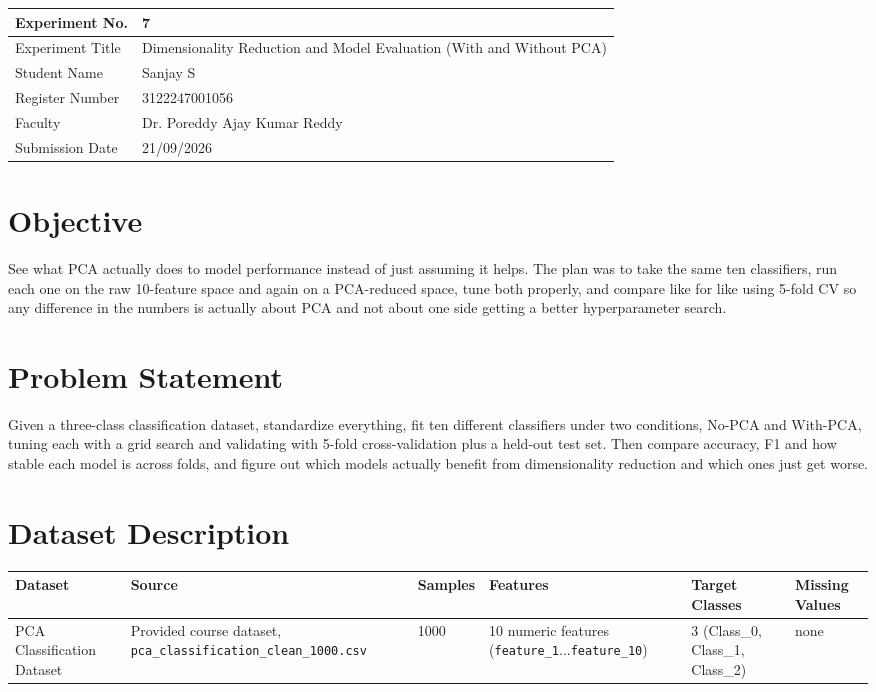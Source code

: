 \documentclass[12pt,a4paper]{article}
\begin{document}
\begin{tabular}{|p{4cm}|p{11cm}|}
\hline
Experiment No. & 7 \\ \hline
Experiment Title & Dimensionality Reduction and Model Evaluation (With and Without PCA)\footnotemark \\ \hline
Student Name & Sanjay S \\ \hline
Register Number & 3122247001056 \\ \hline
Faculty & Dr. Poreddy Ajay Kumar Reddy \\ \hline
Submission Date & 21/09/2026 \\ \hline
\end{tabular}

\section{Objective}
See what PCA actually does to model performance instead of just assuming it helps. The plan was to
take the same ten classifiers, run each one on the raw 10-feature space and again on a PCA-reduced
space, tune both properly, and compare like for like using 5-fold CV so any difference in the numbers
is actually about PCA and not about one side getting a better hyperparameter search.

\section{Problem Statement}
Given a three-class classification dataset, standardize everything, fit ten different classifiers
under two conditions, No-PCA and With-PCA, tuning each with a grid search and validating with 5-fold
cross-validation plus a held-out test set. Then compare accuracy, F1 and how stable each model is
across folds, and figure out which models actually benefit from dimensionality reduction and which
ones just get worse.

\section{Dataset Description}
\begin{longtable}{|p{3cm}|p{3.6cm}|p{1.6cm}|p{1.8cm}|p{2cm}|p{2.5cm}|}
\hline
\textbf{Dataset} & \textbf{Source} & \textbf{Samples} & \textbf{Features} & \textbf{Target Classes} & \textbf{Missing Values} \\ \hline
PCA Classification Dataset & Provided course dataset, \texttt{pca\_classification\_clean\_1000.csv} & 1000 & 10 numeric features (\texttt{feature\_1}...\texttt{feature\_10}) & 3 (Class\_0, Class\_1, Class\_2) & none \\ \hline
\end{longtable}
\end{document}
